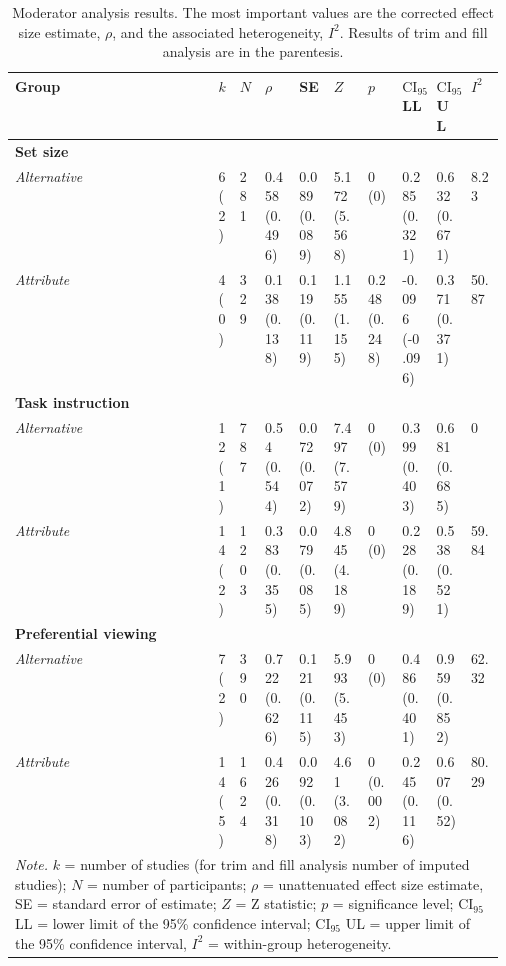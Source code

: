\begin{table}[ht]
\centering
\caption{Moderator analysis results. The most important values are the corrected effect size estimate, $\rho$, and the associated heterogeneity, $I^2$. Results of trim and fill analysis are in the parentesis.} 
\label{tab:mod_results}
\begingroup\small
\begin{tabular}{lp{0.03\linewidth}p{0.05\linewidth}p{0.07\linewidth}p{0.07\linewidth}p{0.07\linewidth}p{0.07\linewidth}p{0.07\linewidth}p{0.07\linewidth}p{0.07\linewidth}}
  \hline
Group & $k$ & $N$ & $\rho$ & SE & $Z$ & $p$ & $\textrm{CI}_{95}$ LL & $\textrm{CI}_{95}$ UL & $I^2$ \\ 
  \hline
\textbf{Set size} &  &  &  &  &  &  &  &  &  \\ 
  \hspace{2mm}\textit{Alternative} & 6 (2) & 281 & 0.458 (0.496) & 0.089 (0.089) & 5.172 (5.568) & 0 (0) & 0.285 (0.321) & 0.632 (0.671) & 8.23 \\ 
  \hspace{2mm}\textit{Attribute} & 4 (0) & 329 & 0.138 (0.138) & 0.119 (0.119) & 1.155 (1.155) & 0.248 (0.248) & -0.096 (-0.096) & 0.371 (0.371) & 50.87 \\ 
  \textbf{Task instruction} &  &  &  &  &  &  &  &  &  \\ 
  \hspace{2mm}\textit{Alternative} & 12 (1) & 787 & 0.54 (0.544) & 0.072 (0.072) & 7.497 (7.579) & 0 (0) & 0.399 (0.403) & 0.681 (0.685) & 0 \\ 
  \hspace{2mm}\textit{Attribute} & 14 (2) & 1203 & 0.383 (0.355) & 0.079 (0.085) & 4.845 (4.189) & 0 (0) & 0.228 (0.189) & 0.538 (0.521) & 59.84 \\ 
  \textbf{Preferential viewing} &  &  &  &  &  &  &  &  &  \\ 
  \hspace{2mm}\textit{Alternative} & 7 (2) & 390 & 0.722 (0.626) & 0.121 (0.115) & 5.993 (5.453) & 0 (0) & 0.486 (0.401) & 0.959 (0.852) & 62.32 \\ 
  \hspace{2mm}\textit{Attribute} & 14 (5) & 1624 & 0.426 (0.318) & 0.092 (0.103) & 4.61 (3.082) & 0 (0.002) & 0.245 (0.116) & 0.607 (0.52) & 80.29 \\ 
   \hline 
 \multicolumn{10}{p{0.9\textwidth}}{\scriptsize{\textit{Note.} $k$ = number of studies (for trim and fill analysis number of imputed studies); $N$ = number of participants; $\rho$ = unattenuated effect size estimate, SE = standard error of estimate; $Z$ = Z statistic; $p$ = significance level; $\textrm{CI}_{95}$ LL = lower limit of the 95\% confidence interval; $\textrm{CI}_{95}$ UL = upper limit of the 95\% confidence interval, $I^2$ = within-group heterogeneity.}} 
\end{tabular}
\endgroup
\end{table}
